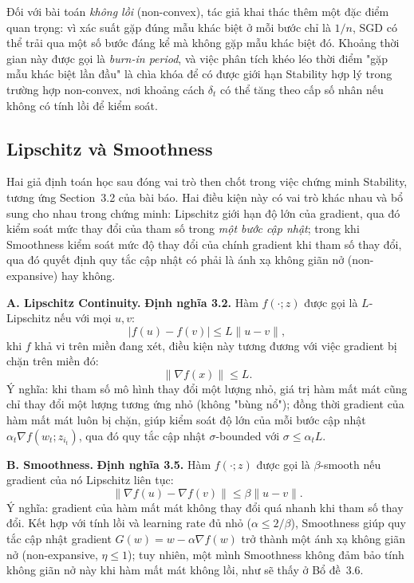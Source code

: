 Đối với bài toán \emph{không lồi} (non-convex), tác giả khai thác thêm một đặc điểm quan trọng: vì xác suất gặp đúng mẫu khác biệt ở mỗi bước chỉ là $1/n$, SGD có thể trải qua một số bước đáng kể mà không gặp mẫu khác biệt đó. Khoảng thời gian này được gọi là \textit{burn-in period}, và việc phân tích khéo léo thời điểm "gặp mẫu khác biệt lần đầu" là chìa khóa để có được giới hạn Stability hợp lý trong trường hợp non-convex, nơi khoảng cách $\delta_t$ có thể tăng theo cấp số nhân nếu không có tính lồi để kiểm soát.

\subsection{Lipschitz và Smoothness}
\label{subsec:lipschitz-smooth}

Hai giả định toán học sau đóng vai trò then chốt trong việc chứng minh Stability, tương ứng Section~3.2 của bài báo. Hai điều kiện này có vai trò khác nhau và bổ sung cho nhau trong chứng minh: Lipschitz giới hạn độ lớn của gradient, qua đó kiểm soát mức thay đổi của tham số trong \emph{một bước cập nhật}; trong khi Smoothness kiểm soát mức độ thay đổi của chính gradient khi tham số thay đổi, qua đó quyết định quy tắc cập nhật có phải là ánh xạ không giãn nở (non-expansive) hay không.

\textbf{A. Lipschitz Continuity.} \textbf{Định nghĩa 3.2.} Hàm $f(\cdot; z)$ được gọi là $L$-Lipschitz nếu với mọi $u, v$:
\[
|f(u) - f(v)| \leq L \|u - v\|,
\]
khi $f$ khả vi trên miền đang xét, điều kiện này tương đương với việc gradient bị chặn trên miền đó:
\[
\|\nabla f(x)\| \leq L.
\]
Ý nghĩa: khi tham số mô hình thay đổi một lượng nhỏ, giá trị hàm mất mát cũng chỉ thay đổi một lượng tương ứng nhỏ (không "bùng nổ"); đồng thời gradient của hàm mất mát luôn bị chặn, giúp kiểm soát độ lớn của mỗi bước cập nhật $\alpha_t \nabla f(w_t; z_{i_t})$, qua đó quy tắc cập nhật $\sigma$-bounded với $\sigma \le \alpha_t L$.

\textbf{B. Smoothness.} \textbf{Định nghĩa 3.5.} Hàm $f(\cdot; z)$ được gọi là $\beta$-smooth nếu gradient của nó Lipschitz liên tục:
\[
\|\nabla f(u) - \nabla f(v)\| \leq \beta \|u - v\|.
\]
Ý nghĩa: gradient của hàm mất mát không thay đổi quá nhanh khi tham số thay đổi. Kết hợp với tính lồi và learning rate đủ nhỏ ($\alpha \le 2/\beta$), Smoothness giúp quy tắc cập nhật gradient $G(w) = w - \alpha \nabla f(w)$ trở thành một ánh xạ không giãn nở (non-expansive, $\eta \le 1$); tuy nhiên, một mình Smoothness không đảm bảo tính không giãn nở này khi hàm mất mát không lồi, như sẽ thấy ở Bổ đề~3.6.


